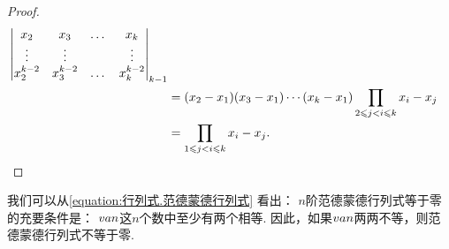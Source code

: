 \begin{example}
\begin{proof}
\begin{align*}
\begin{vmatrix}
x_2 & x_3 & \dots & x_k \\
\vdots & \vdots & & \vdots \\
x_2^{k-2} & x_3^{k-2} & \dots & x_k^{k-2} \\
\end{vmatrix}_{k-1} \\
&= (x_2 - x_1)(x_3 - x_1)\dotsm(x_k - x_1) \prod\limits_{2 \leqslant j < i \leqslant k}{x_i - x_j} \\
&= \prod\limits_{1 \leqslant j < i \leqslant k}{x_i - x_j}.
\qedhere
\end{align*}
\end{proof}
我们可以从\cref{equation:行列式.范德蒙德行列式} 看出：
\(n\)阶范德蒙德行列式等于零的充要条件是：
\(v{a}{n}\)这\(n\)个数中至少有两个相等.
因此，如果\(v{a}{n}\)两两不等，则范德蒙德行列式不等于零.
\end{example}

